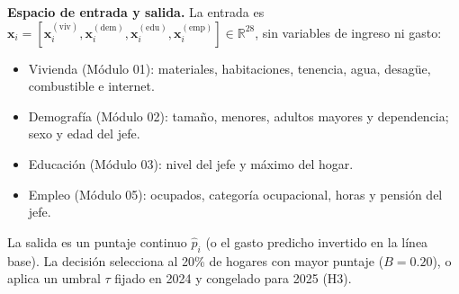 \textbf{Espacio de entrada y salida.} La entrada es $\mathbf{x}_i = [\mathbf{x}_i^{(\text{viv})}, \mathbf{x}_i^{(\text{dem})}, \mathbf{x}_i^{(\text{edu})}, \mathbf{x}_i^{(\text{emp})}] \in \mathbb{R}^{28}$, sin variables de ingreso ni gasto:
\begin{itemize}
    \item Vivienda (Módulo 01): materiales, habitaciones, tenencia, agua, desagüe, combustible e internet.
    \item Demografía (Módulo 02): tamaño, menores, adultos mayores y dependencia; sexo y edad del jefe.
    \item Educación (Módulo 03): nivel del jefe y máximo del hogar.
    \item Empleo (Módulo 05): ocupados, categoría ocupacional, horas y pensión del jefe.
\end{itemize}
La salida es un puntaje continuo $\hat{p}_i$ (o el gasto predicho invertido en la línea base). La decisión selecciona al 20\% de hogares con mayor puntaje ($B = 0.20$), o aplica un umbral $\tau$ fijado en 2024 y congelado para 2025 (H3).

